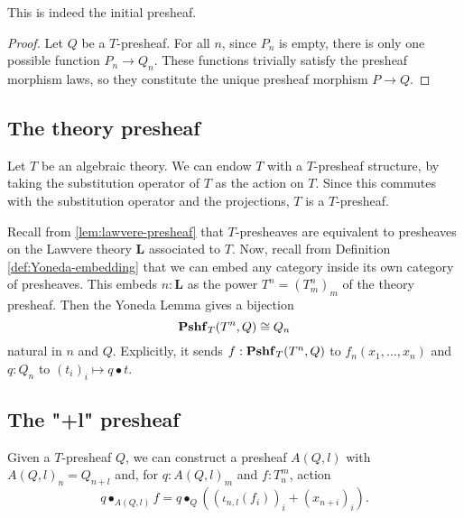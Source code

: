 \begin{lemma}
  This is indeed the initial presheaf.
\end{lemma}
\begin{proof}
  Let $ Q $ be a $ T $-presheaf. For all $ n $, since $ P_n $ is empty, there is only one possible function $ P_n \to Q_n $. These functions trivially satisfy the presheaf morphism laws, so they constitute the unique presheaf morphism $ P \to Q $.
\end{proof}

\subsection{The theory presheaf}
\begin{example}
  Let $ T $ be an algebraic theory. We can endow $ T $ with a $ T $-presheaf structure, by taking the substitution operator of $ T $ as the action on $ T $. Since this commutes with the substitution operator and the projections, $ T $ is a $ T $-presheaf.
\end{example}

\begin{remark}\label{rem:presheaf-Yoneda}
  Recall from \ref{lem:lawvere-presheaf} that $ T $-presheaves are equivalent to presheaves on the Lawvere theory $ \mathbf L $ associated to $ T $. Now, recall from Definition \ref{def:Yoneda-embedding} that we can embed any category inside its own category of presheaves. This embeds $ n: \mathbf L $ as the power $ T^n = (T_m^n)_m $ of the theory presheaf. Then the Yoneda Lemma gives a bijection
  \[ \mathbf{Pshf}_{T}(T^n, Q) \cong Q_n \]
  natural in $ n $ and $ Q $. Explicitly, it sends $ f: \mathbf{Pshf}_{T}(T^n, Q) $ to $ f_n(x_1, \dots, x_n) $ and $ q: Q_n $ to $ (t_i)_i \mapsto q \bullet t $.
\end{remark}

\subsection{The "+l" presheaf}

\begin{example}
  Given a $ T $-presheaf $ Q $, we can construct a presheaf $ A(Q, l) $ with $ A(Q, l)_n = Q_{n + l} $ and, for $ q: A(Q, l)_m $ and $ f: T_n^m $, action
  \[ q \bullet_{A(Q, l)} f = q \bullet_Q ((\iota_{n, l} (f_i))_i + (x_{n + i})_i). \]
\end{example}

